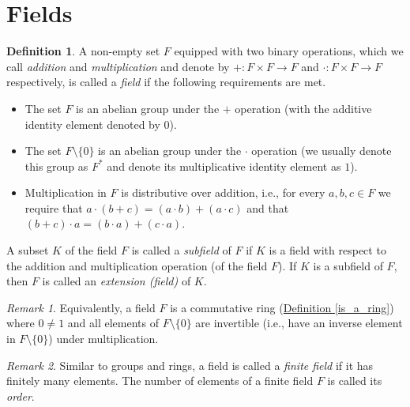 \documentclass[openany, a4paper, 10pt]{book}
\theoremstyle{plain}
\theoremstyle{plain}
\theoremstyle{plain}
\theoremstyle{definition}
\newtheorem{definition}[theorem]{Definition}
\theoremstyle{plain}
\theoremstyle{definition}
\theoremstyle{remark}
\newtheorem*{remark}{Remark}
\newcommand{\defref}[1]{\hyperref[#1]{Definition \ref{#1}}}
\begin{document}
\section{Fields}
\begin{definition}\label{is_a_field}
    A non-empty set $F$ equipped with two binary operations, which we call \textit{addition} and \textit{multiplication} and denote by $+: F\times F \to F$ and $\cdot: F\times F \to F$ respectively, is called a \textit{field} if the following requirements are met.
    \begin{itemize}
        \item The set $F$ is an abelian group under the $+$ operation (with the additive identity element denoted by $0$).
        \item The set $F\setminus \{ 0 \}$ is an abelian group under the $\cdot$ operation (we usually denote this group as $F^*$ and denote its multiplicative identity element as $1$).
        \item Multiplication in $F$ is distributive over addition, i.e., for every $a,b,c \in F$ we require that $a \cdot (b + c) = (a \cdot b) + (a \cdot c)$ and that $(b+c) \cdot a = (b\cdot a) + (c \cdot a)$.
    \end{itemize}
    A subset $K$ of the field $F$ is called a \textit{subfield} of $F$ if $K$ is a field with respect to the addition and multiplication operation (of the field $F$).
    If $K$ is a subfield of $F$, then $F$ is called an \textit{extension (field)} of $K$.
\end{definition}
\begin{remark}
    Equivalently, a field $F$ is a commutative ring (\defref{is_a_ring}) where $0 \neq 1$ and all elements of $F \setminus \{ 0 \}$ are invertible (i.e., have an inverse element in $F \setminus \{ 0 \}$) under multiplication.
\end{remark}
\begin{remark}
    Similar to groups and rings, a field is called a \textit{finite field} if it has finitely many elements.
    The number of elements of a finite field $F$ is called its \textit{order}.
\end{remark}
\end{document}
